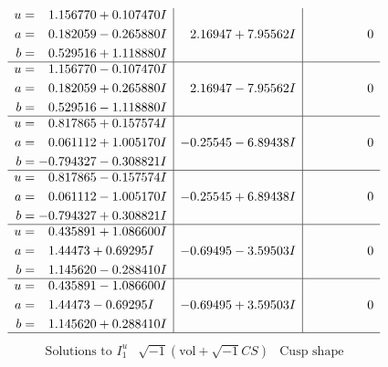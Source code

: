 \documentclass[1p]{elsarticle_modified}
\theoremstyle{definition}
\newcommand{\I}{\sqrt{-1}}
\begin{document}
$$\begin{array}{c|c|c}
\begin{aligned}
u &= \phantom{-}1.156770 + 0.107470 I \\
a &= \phantom{-}0.182059 - 0.265880 I \\
b &= \phantom{-}0.529516 + 1.118880 I\end{aligned}
 & \phantom{-}2.16947 + 7.95562 I & \phantom{-0.000000 } 0 \\ \hline\begin{aligned}
u &= \phantom{-}1.156770 - 0.107470 I \\
a &= \phantom{-}0.182059 + 0.265880 I \\
b &= \phantom{-}0.529516 - 1.118880 I\end{aligned}
 & \phantom{-}2.16947 - 7.95562 I & \phantom{-0.000000 } 0 \\ \hline\begin{aligned}
u &= \phantom{-}0.817865 + 0.157574 I \\
a &= \phantom{-}0.061112 + 1.005170 I \\
b &= -0.794327 - 0.308821 I\end{aligned}
 & -0.25545 - 6.89438 I & \phantom{-0.000000 } 0 \\ \hline\begin{aligned}
u &= \phantom{-}0.817865 - 0.157574 I \\
a &= \phantom{-}0.061112 - 1.005170 I \\
b &= -0.794327 + 0.308821 I\end{aligned}
 & -0.25545 + 6.89438 I & \phantom{-0.000000 } 0 \\ \hline\begin{aligned}
u &= \phantom{-}0.435891 + 1.086600 I \\
a &= \phantom{-}1.44473 + 0.69295 I \\
b &= \phantom{-}1.145620 - 0.288410 I\end{aligned}
 & -0.69495 - 3.59503 I & \phantom{-0.000000 } 0 \\ \hline\begin{aligned}
u &= \phantom{-}0.435891 - 1.086600 I \\
a &= \phantom{-}1.44473 - 0.69295 I \\
b &= \phantom{-}1.145620 + 0.288410 I\end{aligned}
 & -0.69495 + 3.59503 I & \phantom{-0.000000 } 0\\
 \hline 
 \end{array}$$\newpage$$\begin{array}{c|c|c}  
\text{Solutions to }I^u_{1}& \I (\text{vol} + \sqrt{-1}CS) & \text{Cusp shape}\\

\end{array}$$
\end{document}
